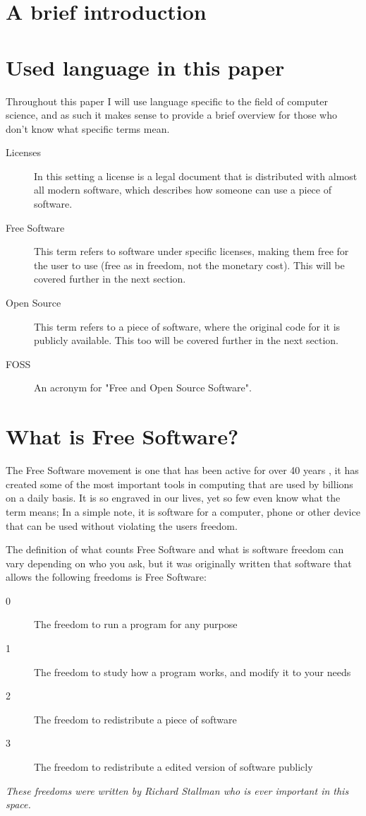 \documentclass[a4paper,12pt]{article}
\begin{document}
{\setlength{\parindent}{0cm}

\section{A brief introduction}

\section{Used language in this paper}
Throughout this paper I will use language specific to the field of computer science, and as such
it makes sense to provide a brief overview for those who don't know what specific terms mean.

\begin{description}
	\item[Licenses] In this setting a license is a legal document that is distributed with
		almost all modern software, which describes how someone can use a piece of software.
	\item[Free Software] This term refers to software under specific licenses, making them 
		free for the user to use (free as in freedom, not the monetary cost). This will
		be covered further in the next section.
	\item[Open Source] This term refers to a piece of software, where the original code for it
		is publicly available. This too will be covered further in the next section.
	\item[FOSS] An acronym for "Free and Open Source Software".
\end{description}

\section{What is Free Software?}
The Free Software movement is one that has been active for over 40 years \cite{GNUmaifesto}, it has
created some of the most important tools in computing that are used by billions on a daily basis. 
It is so engraved in our lives, yet so few even know what the term means; In a simple note, it is
software for a computer, phone or other device that can be used without violating the users 
freedom.

The definition of what counts Free Software and what is software freedom can vary depending on who 
you ask, but it was originally written that software that allows the following freedoms is 
Free Software:

\begin{description}
	\item[0] The freedom to run a program for any purpose
	\item[1] The freedom to study how a program works, and modify it to your needs
	\item[2] The freedom to redistribute a piece of software
	\item[3] The freedom to redistribute a edited version of software publicly
\end{description}
\textit{These freedoms were written by Richard Stallman\cite{FOSSdef} who is ever 
	important in this space.}

}
\end{document}
